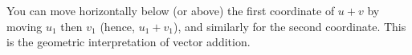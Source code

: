\documentclass{ximera}
\begin{document}
\begin{example}
\begin{remark}

You can move horizontally below (or above) the first coordinate of $u+v$ by moving $u_1$ then $v_1$ (hence, $u_1+v_1$), and similarly for the second coordinate. This is the geometric interpretation of vector addition.

  \end{remark}

\end{example}
\end{document}
